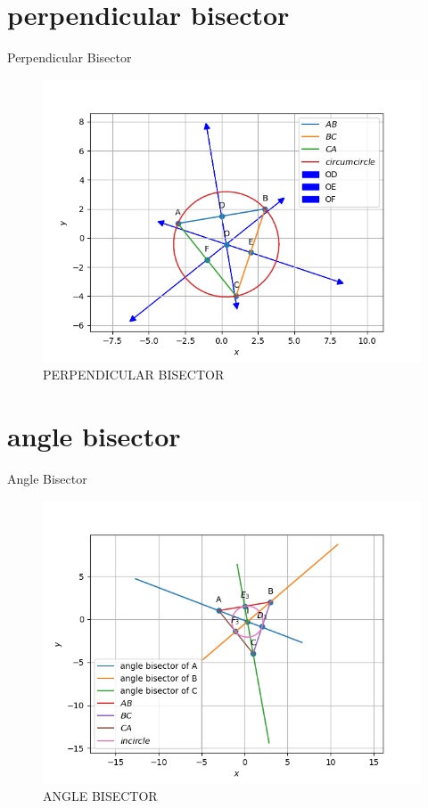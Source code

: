 \documentclass[journal,12pt,onecolumn]{IEEEtran}
\theoremstyle{remark}
\begin{document}
\begin{table}[!ht]
	\section{perpendicular bisector}
	\centering
	
	\caption{Perpendicular Bisector}
	\label{table:Perpendicular Bisector}
\end{table}
\begin{figure}
\includegraphics[width=\columnwidth]{figs/Q1.4.1.png}
\caption{PERPENDICULAR BISECTOR}
\label{fig:perpendicular bisector}
\end{figure}
\begin{table}[!ht]
	\section{angle bisector}
	\centering
	
	\caption{Angle Bisector}
	\label{table:Angle Bisector}
\end{table}
\begin{figure}
\includegraphics[width=\columnwidth]{figs/Q1.5.1.png}
\caption{ANGLE BISECTOR}
\label{fig:angle bisector}
\end{figure}
\end{document}
